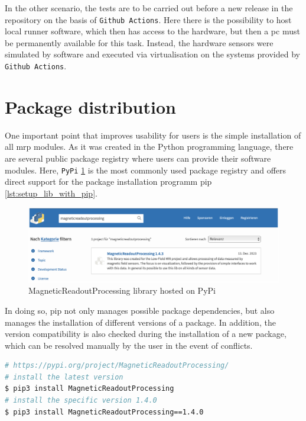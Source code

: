 In the other scenario, the tests are to be carried out before a new
release in the repository on the basis of
\passthrough{\lstinline!Github Actions!}\cite{GithubActions}. Here
there is the possibility to host local runner software, which then has
access to the hardware, but then a \gls{pc} must be permanently
available for this task. Instead, the hardware sensors were simulated by
software and executed via virtualisation on the systems provided by
\passthrough{\lstinline!Github Actions!}\cite{GithubActions}.

\hypertarget{package-distribution}{%
\section{Package distribution}\label{package-distribution}}

One important point that improves usability for users is the simple
installation of all \gls{mrp} modules. As it was created in the Python
programming language, there are several public package registry where
users can provide their software modules. Here,
\passthrough{\lstinline!PyPi!}\cite{PyPI}
\ref{MagneticReadoutProcessing_library_hosted_on_PyPi.png}\cite{MagneticReadoutProcessingPyPI}
is the most commonly used package registry and offers direct support for
the package installation programm \gls{pip}
\ref{lst:setup_lib_with_pip}.

\begin{figure}
\centering
\includegraphics{./generated_images/border_MagneticReadoutProcessing_library_hosted_on_PyPi.png}
\caption{MagneticReadoutProcessing library hosted on PyPi
\label{MagneticReadoutProcessing_library_hosted_on_PyPi.png}}
\end{figure}

In doing so, \gls{pip} not only manages possible package dependencies,
but also manages the installation of different versions of a package. In
addition, the version compatibility is also checked during the
installation of a new package, which can be resolved manually by the
user in the event of conflicts.

\begin{lstlisting}[language=bash, caption={Bash commands to install the MagneticReadoutProcessing library using pip}, label=lst:setup_lib_with_pip]
# https://pypi.org/project/MagneticReadoutProcessing/
# install the latest version
$ pip3 install MagneticReadoutProcessing
# install the specific version 1.4.0
$ pip3 install MagneticReadoutProcessing==1.4.0
\end{lstlisting}

